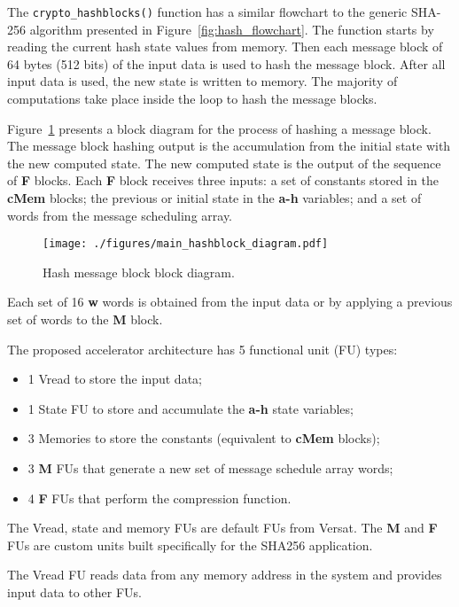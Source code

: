 The \texttt{crypto\_hashblocks()} function has a similar flowchart to the
generic SHA-256 algorithm presented in Figure~\ref{fig:hash_flowchart}.
The function starts by reading the current hash state values from memory. Then 
each message block of 64 bytes (512 bits) of the input data is used to hash the 
message block.
After all input data is used, the new state is written to memory.
The majority of computations take place inside the loop to hash the message
blocks.

Figure~\ref{fig:main_hashblock_diagram} presents a block diagram for the
process of hashing a message block.
The message block hashing output is the accumulation from the initial state
with the new computed state.
The new computed state is the output of the sequence of \textbf{F} blocks. Each
\textbf{F} block receives three inputs: a set of constants stored in the
\textbf{cMem} blocks; the previous or initial state in the \textbf{a-h}
variables; and a set of words from the message scheduling array.

\begin{figure}[!htbp]
    \centerline{\texttt{[image: ./figures/main\_hashblock\_diagram.pdf]}}
    \vspace{0cm}\caption{Hash message block block diagram.}
    \label{fig:main_hashblock_diagram}
\end{figure}

Each set of 16 \textbf{w} words is obtained from the input data or by applying a
previous set of words to the \textbf{M} block.

The proposed accelerator architecture has 5 functional unit (FU) types:
\begin{itemize}
    \item 1 Vread to store the input data;
    \item 1 State FU to store and accumulate the \textbf{a-h} state variables;
    \item 3 Memories to store the constants (equivalent to \textbf{cMem}
        blocks);
    \item 3 \textbf{M} FUs that generate a new set of message schedule array
        words;
    \item 4 \textbf{F} FUs that perform the compression function.
\end{itemize}

The Vread, state and memory FUs are default FUs from Versat. The \textbf{M} and
\textbf{F} FUs are custom units built specifically for the SHA256 application.

The Vread FU reads data from any memory address in the system and provides input
data to other FUs.


